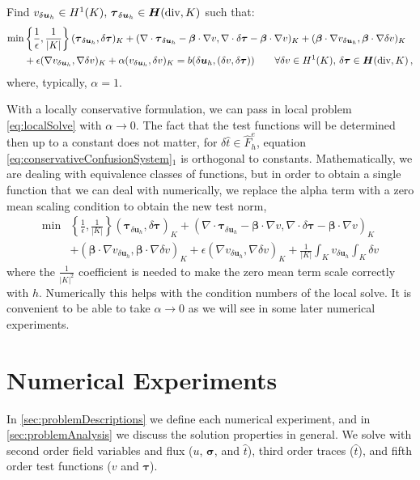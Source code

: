 \documentclass[letterpaper]{article}
\def\btau{\boldsymbol\tau}
\def\bsigma{\boldsymbol\sigma}
\def\bbeta{\boldsymbol\beta}
\newcommand{\bs}[1]{\boldsymbol{#1}}
\newcommand{\bfH}{\mbox{\boldmath $H$}}
\newcommand{\HdivK}{\bfH(\text{div},K)}
\newcommand{\HOneK}{H^{1}(K)}
\newcommand{\vdeltau}{v_{\delta\bs u_h}}
\newcommand{\taudeltau}{\btau_{\delta\bs u_h}}
\begin{document}
Find $\vdeltau\in\HOneK,\,\taudeltau\in\HdivK$ such that:
\begin{align}
\min&\left\{\frac{1}{\epsilon},\frac{1}{|K|}\right\}(\taudeltau,\delta\btau)_K
+(\nabla\cdot\taudeltau-\bbeta\cdot\nabla
v,\nabla\cdot\delta\btau-\bbeta\cdot\nabla v)_K
+(\bbeta\cdot\nabla\vdeltau,\bbeta\cdot\nabla \delta v)_K\nonumber\\
&+\epsilon(\nabla\vdeltau,\nabla \delta v)_K
+\alpha(\vdeltau,\delta v)_K
=b(\delta\bs u_h,(\delta v,\delta\btau))
\quad\quad\forall\delta v\in\HOneK,\,\delta\btau\in\HdivK\,,
\label{eq:localSolve}
\end{align}
where, typically, $\alpha=1$.

With a locally conservative formulation, we can pass in local problem
\eqref{eq:localSolve} with $\alpha\rightarrow0$. The fact that the test
functions will be determined then up to a constant does not matter, for
$\delta\hat t\in\hat F_h^e$, equation
\eqref{eq:conservativeConfusionSystem}$_1$ is orthogonal to constants.
Mathematically, we are dealing with equivalence classes of functions, but in
order to obtain a single function that we can deal with numerically, we
replace the alpha term with a zero mean scaling condition to obtain the new
test norm,
\begin{align}
\min&\left\{\frac{1}{\epsilon},\frac{1}{|K|}\right\}(\taudeltau,\delta\btau)_K
+(\nabla\cdot\taudeltau-\bbeta\cdot\nabla
v,\nabla\cdot\delta\btau-\bbeta\cdot\nabla v)_K\\
&+(\bbeta\cdot\nabla\vdeltau,\bbeta\cdot\nabla \delta v)_K\nonumber
+\epsilon(\nabla\vdeltau,\nabla \delta v)_K
+\frac{1}{|K|}\int_K\vdeltau\int_K\delta v
\label{eq:localSolveMod}
\end{align}
where the $\frac{1}{|K|^2}$ coefficient is needed to make the zero mean term
scale correctly with $h$. Numerically this helps with the condition
numbers of the local solve.
It is convenient to be able to take $\alpha\rightarrow0$ as we will see in
some later numerical experiments.

\section{Numerical Experiments}
In \ref{sec:problemDescriptions} we define each numerical experiment, and in
\ref{sec:problemAnalysis} we discuss the solution properties in general. We
solve with second order field variables and flux ($u$, $\bsigma$, and $\hat
t$), third order traces ($\hat t$), and fifth order test functions ($v$ and
$\btau$).
\end{document}
